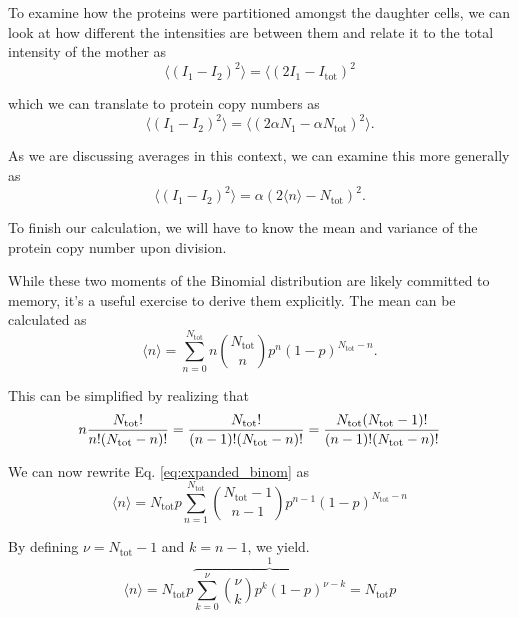 To examine how the proteins were partitioned amongst the daughter cells, we can
look at how different the intensities are between them and relate it to the
total intensity of the mother as
\begin{equation}
\langle(I_1 - I_2)^2\rangle = \langle (2I_1 - I_\text{tot})^2
\end{equation}

which we can translate to protein copy numbers as
\begin{equation}
\langle(I_1 - I_2)^2\rangle = \langle\left(2\alpha N_1 - \alpha N_\text{tot}\right)^2\rangle.
\end{equation}

As we are discussing averages in this context, we can examine this more generally as
\begin{equation}
\langle(I_1 - I_2)^2 \rangle = \alpha(2\langle n \rangle - N_\text{tot})^2.
\end{equation}

To finish our calculation, we will have to know the mean and variance of the
protein copy number upon division.

While these two moments of the Binomial distribution are likely committed to
memory, it's a useful exercise to derive them explicitly. The mean can be
calculated as
\begin{equation}
\langle n \rangle = \sum\limits_{n = 0}^{N_\text{tot}}n{{N_\text{tot}}\choose{n}}p^{n}(1-p)^{N_\text{tot} - n}.
\label{eq:avg_n}
\end{equation}

This can be simplified by realizing that
\begin{equation}
n {N_\text{tot}! \over n!(N_\text{tot} - n)!} = {N_\text{tot}! \over (n-1)!(N_\text{tot} - n)!} = {N_\text{tot}(N_\text{tot} - 1)! \over (n - 1)!(N_\text{tot} - n)!}
\label{eq:expanded_binom}
\end{equation}

We can now rewrite Eq. \ref{eq:expanded_binom} as
\begin{equation}
\langle n \rangle = N_\text{tot} p \sum\limits_{n= 1}^{N_\text{tot}}{{N_\text{tot} - 1}\choose{n - 1}}p^{n - 1}(1 - p)^{N_\text{tot} - n}
\end{equation}

By defining $\nu = N_\text{tot} - 1$ and $k = n - 1$, we yield.
\begin{equation}
\langle n \rangle = N_\text{tot} p \overbrace{\sum\limits_{k= 0}^{\nu}{{\nu}\choose{k}}p^k(1 - p)^{\nu - k}}^\text{1} = N_\text{tot} p
\label{eq:reparam_binom}
\end{equation}


